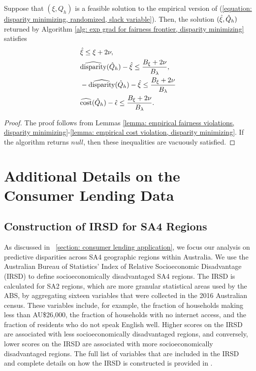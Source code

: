 \documentclass{article}
\begin{document}
\begin{lemma}\label{lemma: solution quality, disparity minimizing}
    Suppose that $(\xi, Q_h)$ is a feasible solution to the empirical version of (\ref{equation: disparity minimizing, randomized, slack variable}). Then, the solution $(\hat \xi, \hat{Q}_h)$ returned by Algorithm \ref{alg: exp grad for fairness frontier, disparity minimizing} satisfies
        \begin{align*}
            & \hat{\xi} \leq \xi + 2 \nu, \\
            & \widehat{\operatorname{disparity}}(\hat{Q}_h) - \hat \xi \leq \frac{B_\xi + 2 \nu}{B_\lambda}, \\
            & -\widehat{\operatorname{disparity}}(\hat{Q}_h) - \hat \xi \leq \frac{B_\xi + 2 \nu}{B_\lambda} \\
            & \widehat{\operatorname{cost}}(\hat{Q}_h) - \hat{\epsilon} \leq \frac{ B_\xi + 2 \nu }{ B_\lambda }.
        \end{align*}
\end{lemma}
\begin{proof}
The proof follows from Lemmas \ref{lemma: empirical fairness violations, disparity minimizing}-\ref{lemma: empirical cost violation, disparity minimizing}. If the algorithm returns $null$, then these inequalities are vacuously satisfied. 
\end{proof}

\section{Additional Details on the Consumer Lending Data}\label{section: additional details on lending data}

\subsection{Construction of IRSD for SA4 Regions}\label{section: additional details on the IRSD}
As discussed in \textsection~\ref{section: consumer lending application}, we focus our analysis on predictive disparities across SA4 geographic regions within Australia. We use the Australian Bureau of Statistics' Index of Relative Socioeconomic Disadvantage (IRSD) to define socioeconomically disadvantaged SA4 regions. The IRSD is calculated for SA2 regions, which are more granular statistical areas used by the ABS, by aggregating sixteen variables that were collected in the 2016 Australian census. These variables include, for example, the fraction of households making less than AU\$26,000, the fraction of households with no internet access, and the fraction of residents who do not speak English well. Higher scores on the IRSD are associated with less socioeconomically disadvantaged regions, and conversely, lower scores on the IRSD are associated with more socioeconomically disadvantaged regions. The full list of variables that are included in the IRSD and complete details on how the IRSD is constructed is provided in \cite{SEIFA(16)}.
\end{document}
